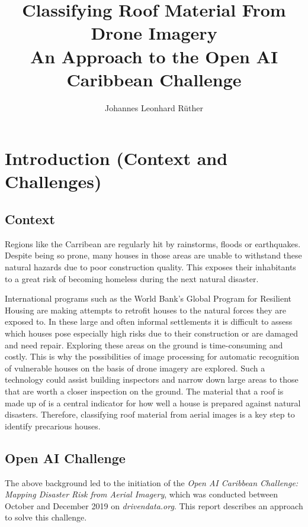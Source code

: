 \documentclass[11pt]{article}
\title{\bf{Classifying Roof Material From Drone Imagery} \\
 An Approach to the Open AI Caribbean Challenge}
\author{Johannes Leonhard Rüther}
\begin{document}
	\maketitle
	
	\section{Introduction (Context and Challenges)}
	
	\subsection{Context}
	
	Regions like the Carribean are regularly hit by rainstorms, floods or earthquakes. Despite being so prone, many houses in those areas are unable to withstand these natural hazards due to poor construction quality. This exposes their inhabitants to a great risk of becoming homeless during the next natural disaster. 
	
	International programs such as the World Bank's Global Program for Resilient Housing are making attempts to retrofit houses to the natural forces they are exposed to. In these large and often informal settlements it is difficult to assess which houses pose especially high risks due to their construction or are damaged and need repair. Exploring these areas on the ground is time-consuming and costly. 
	This is why the possibilities of image processing for automatic recognition of vulnerable houses on the basis of drone imagery are explored. Such a technology could assist building inspectors and narrow down large areas to those that are worth a closer inspection on the ground. 
	The material that a roof is made up of is a central indicator for how well a house is prepared against natural disasters. Therefore, classifying roof material from aerial images is a key step to identify precarious houses. \\
	
	\subsection{Open AI Challenge}
	
	The above background led to the initiation of the \textit{Open AI Caribbean Challenge: Mapping Disaster Risk from Aerial Imagery}, which was conducted between October and December 2019 on \textit{drivendata.org}.	
	This report describes an approach to solve this challenge.\\
	
\end{document}
